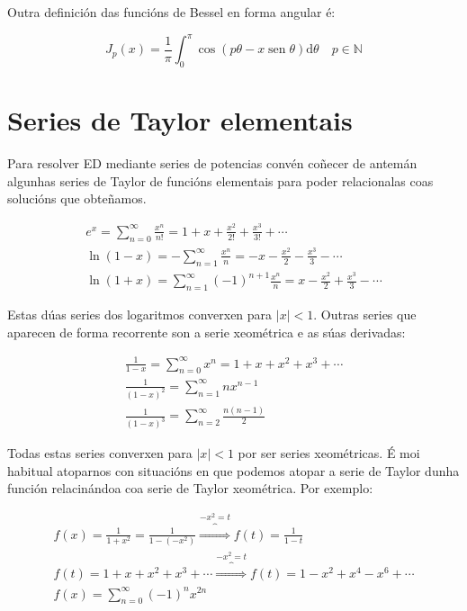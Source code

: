 \documentclass[a4paper,12pt,titlepage]{article}
\begin{document}
Outra definición das funcións de Bessel en forma angular é:

$$
J_{p}(x)=\frac{1}{\pi} \int_{0}^{\pi} \cos (p \theta-x \operatorname{sen} \theta) \mathrm{d} \theta \quad p \in \mathbb{N}
$$

\section{Series de Taylor elementais}

Para resolver ED mediante series de potencias convén coñecer de antemán algunhas series de Taylor de funcións elementais para poder relacionalas coas solucións que obteñamos.

\begin{equation*}
    \begin{gathered}
        e^x = \sum_{n=0}^{\infty} \frac{x^n}{n!} = 1 +x + \frac{x^2}{2!} + \frac{x^3}{3!} + \cdots \\
        \ln (1-x) = - \sum_{n=1}^{\infty} \frac{x^n}{n} = -x - \frac{x^2}{2} - \frac{x^3}{3} - \cdots \\
        \ln (1+x) =  \sum_{n=1}^{\infty} \left (-1 \right )^{n+1} \frac{x^n}{n} = x - \frac{x^2}{2} + \frac{x^3}{3} - \cdots
    \end{gathered}
\end{equation*}

Estas dúas series dos logaritmos converxen para $|x|<1$. Outras series que aparecen de forma recorrente son a serie xeométrica e as súas derivadas:

\begin{equation*}
    \begin{gathered}
        \frac{1}{1-x} = \sum_{n=0}^{\infty} x^n = 1 + x + x^2 + x^3 + \cdots \\
        \frac{1}{(1-x)^2} = \sum_{n=1}^{\infty} nx^{n-1} \\
        \frac{1}{(1-x)^3} = \sum_{n=2}^{\infty} \frac{n(n-1)}{2}
    \end{gathered}
\end{equation*}

Todas estas series converxen para $|x|<1$ por ser series xeométricas. É moi habitual atoparnos con situacións en que podemos atopar a serie de Taylor dunha función relacinándoa coa serie de Taylor xeométrica. Por exemplo:

\begin{equation*}
    \begin{gathered}
    f(x) = \frac{1}{1 + x^2} = \frac{1}{1 - (-x^2)} \overbrace{\Rightarrow}^{-x^2=t} f(t) = \frac{1}{1-t} \\
    f(t) = 1 +x +x^2 +x^3 + \cdots \overbrace{\Rightarrow}^{-x^2=t} f(t) = 1 -x^2 + x^4 -x^6 + \cdots \\
    f(x) = \sum_{n=0}^{\infty} \left (-1 \right )^n x^{2n}
    \end{gathered}
\end{equation*}
\end{document}

